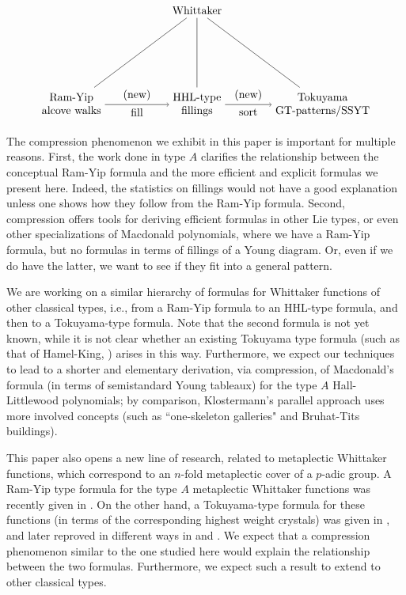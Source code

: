\documentclass[11pt]{amsart}
\begin{document}
{\[
\begin{tikzpicture}[node distance=3cm]
\tikzset{edge/.style = {->}}
\node(0){\text{Whittaker}};
\node(1)[below of =0, xshift=-4cm]{$\begin{matrix}\text{Ram-Yip} \\\text{alcove walks}\end{matrix}$};
\node(2)[below of =0]{$\begin{matrix}\text{HHL-type} \\\text{fillings}\end{matrix}$};
\node(3)[below of =0, xshift=4cm]{$\begin{matrix}\text{Tokuyama} \\\text{GT-patterns/SSYT}\end{matrix}$};
\draw(0)--(1);
\draw(0)--(2);
\draw(0)--(3);
\draw[edge] (1) to node[below]{fill} node[above]{(new)} (2) ;
\draw[edge] (2) to node[anchor=north]{sort}node[above]{(new)}(3) ;
\end{tikzpicture}
\]
\indent The compression phenomenon we exhibit in this paper is important for multiple reasons. First, the work done in type $A$ clarifies the relationship between the conceptual Ram-Yip formula and the more efficient and explicit formulas we present here. Indeed, the statistics on fillings would not have a good explanation unless one shows how they follow from the Ram-Yip formula. Second, compression offers tools for deriving efficient formulas in other Lie types, or even other specializations of Macdonald polynomials, where we have a Ram-Yip formula, but no formulas in terms of fillings of a Young diagram. Or, even if we do have the latter, we want to see if they fit into a general pattern. 

\indent We are working on a similar hierarchy of formulas for Whittaker functions of other classical types, i.e., from a Ram-Yip formula to an HHL-type formula, and then to a Tokuyama-type formula. Note that the second formula is not yet known, while it is not clear whether an existing Tokuyama type formula (such as that of Hamel-King, \cite{HK}) arises in this way. Furthermore, we expect our techniques to lead to a shorter and elementary derivation, via compression, of Macdonald's formula (in terms of semistandard Young tableaux) for the type $A$ Hall-Littlewood polynomials; by comparison, Klostermann's parallel approach \cite{IK} uses more involved concepts (such as ``one-skeleton galleries" and Bruhat-Tits buildings).

\indent This paper also opens a new line of research, related to metaplectic Whittaker functions, which correspond to an $n$-fold metaplectic cover of a $p$-adic group. A Ram-Yip type formula for the type $A$ metaplectic Whittaker functions was recently given in \cite{SA}. On the other hand, a Tokuyama-type formula for these functions (in terms of the corresponding highest weight crystals) was given in \cite{BBF}, and later reproved in different ways in \cite{McN} and \cite{AP1}. We expect that a compression phenomenon similar to the one studied here would explain the relationship between the two formulas. Furthermore, we expect such a result to extend to other classical types.

}
\end{document}
